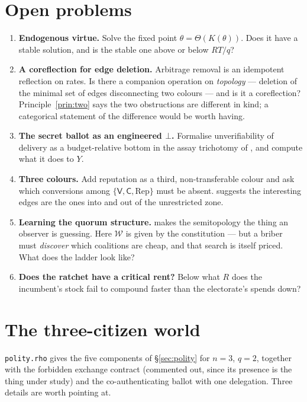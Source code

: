 \documentclass[11pt]{article}
\theoremstyle{plain}
\theoremstyle{definition}
\theoremstyle{remark}
\newcommand{\Vt}{\mathsf{V}}
\newcommand{\Ct}{\mathsf{C}}
\newcommand{\Win}{\mathcal{W}}
\begin{document}
\section{Open problems}

\begin{enumerate}[leftmargin=1.8em]
\item \textbf{Endogenous virtue.} Solve the fixed point
$\theta = \Theta(K(\theta))$. Does it have a stable solution, and is the stable
one above or below $RT/q$?
\item \textbf{A coreflection for edge deletion.} Arbitrage removal is an
idempotent reflection on rates. Is there a companion operation on
\emph{topology} --- deletion of the minimal set of edges disconnecting two
colours --- and is it a coreflection? Principle~\ref{prin:two} says the two
obstructions are different in kind; a categorical statement of the difference
would be worth having.
\item \textbf{The secret ballot as an engineered $\bot$.} Formalise
unverifiability of delivery as a budget-relative bottom in the assay trichotomy
of \cite[\S4]{scientist}, and compute what it does to $Y$.
\item \textbf{Three colours.} Add reputation as a third, non-transferable
colour and ask which conversions among $\{\Vt,\Ct,\text{Rep}\}$ must be absent.
\cite{typedval} suggests the interesting edges are the ones into and out of the
unrestricted zone.
\item \textbf{Learning the quorum structure.} \cite{quorum} makes the
semitopology the thing an observer is guessing. Here $\Win$ is given by the
constitution --- but a briber must \emph{discover} which coalitions are cheap,
and that search is itself priced. What does the ladder look like?
\item \textbf{Does the ratchet have a critical rent?} Below what $R$ does the
incumbent's stock fail to compound faster than the electorate's spends down?
\end{enumerate}

\appendix

\section{The three-citizen world}
\label{app:rho}

\texttt{polity.rho} gives the five components of \S\ref{sec:polity} for $n = 3$,
$q = 2$, together with the forbidden exchange contract (commented out, since its
presence is the thing under study) and the co-authenticating ballot with one
delegation. Three details are worth pointing at.
\end{document}
